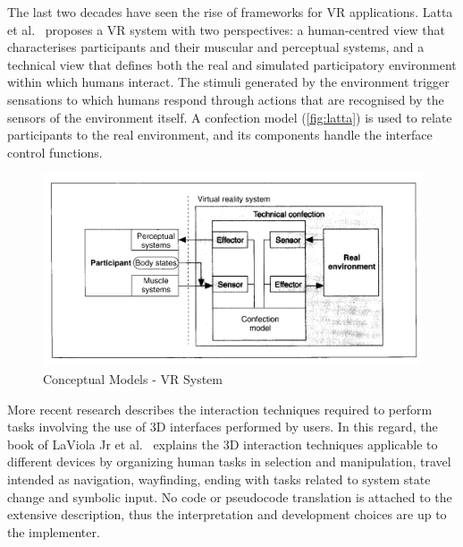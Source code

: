 The last two decades have seen the rise of frameworks for VR applications. Latta et al.~\cite{latta_conceptual_1994} proposes a VR system with two perspectives: a human-centred view that characterises participants and their muscular and perceptual systems, and a technical view that defines both the real and simulated participatory environment within which humans interact. The stimuli generated by the environment trigger sensations to which humans respond through actions that are recognised by the sensors of the environment itself. A confection model (\autoref{fig:latta}) is used to relate participants to the real environment, and its components handle the interface control functions. 

\begin{figure}[h]
    \centering
    \includegraphics[width=\textwidth]{Figures/Background/models/latta.png}
    \caption{Conceptual Models - VR System}
    \label{fig:latta}
\end{figure}

More recent research describes the interaction techniques required to perform tasks involving the use of 3D interfaces performed by users. In this regard, the book of LaViola Jr et al.~\cite{laviola_jr_3d_2017} explains the 3D interaction techniques applicable to different devices by organizing human tasks in selection and manipulation, travel intended as navigation, wayfinding, ending with tasks related to system state change and symbolic input. No code or pseudocode translation is attached to the extensive description, thus the interpretation and development choices are up to the implementer. 

